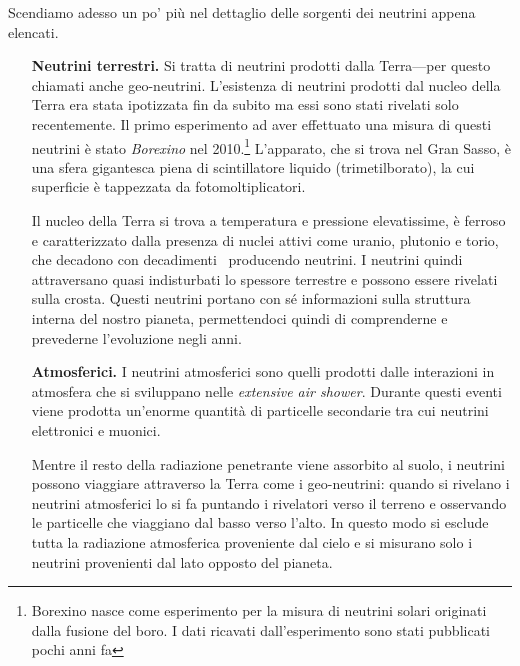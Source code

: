         Scendiamo adesso un po' più nel dettaglio delle sorgenti dei neutrini appena elencati.
        \begin{enumerate}[wide = 0pt, leftmargin = \parindent]
            \item[\textbf{Neutrini terrestri.}] Si tratta di neutrini prodotti dalla Terra---per questo chiamati anche geo-neutrini. L'esistenza di neutrini prodotti dal nucleo della Terra era stata ipotizzata fin da subito ma essi sono stati rivelati solo recentemente. Il primo esperimento ad aver effettuato una misura di questi neutrini è stato \emph{Borexino} nel 2010.\footnote{Borexino nasce come esperimento per la misura di neutrini solari originati dalla fusione del boro. I dati ricavati dall'esperimento sono stati pubblicati pochi anni fa} L'apparato, che si trova nel Gran Sasso, è una sfera gigantesca piena di scintillatore liquido (trimetilborato), la cui superficie è tappezzata da fotomoltiplicatori.
            
            Il nucleo della Terra si trova a temperatura e pressione elevatissime, è ferroso e caratterizzato dalla presenza di nuclei attivi come uranio, plutonio e torio, che decadono con decadimenti \betap\ producendo neutrini. I neutrini quindi attraversano quasi indisturbati lo spessore terrestre e possono essere rivelati sulla crosta. Questi neutrini portano con sé informazioni sulla struttura interna del nostro pianeta, permettendoci quindi di comprenderne e prevederne l'evoluzione negli anni.
            
            
            \item[\textbf{Atmosferici.}] I neutrini atmosferici sono quelli prodotti dalle interazioni in atmosfera che si sviluppano nelle \textit{extensive air shower}. Durante questi eventi viene prodotta un'enorme quantità di particelle secondarie tra cui neutrini elettronici e muonici.
            
            Mentre il resto della radiazione penetrante viene assorbito al suolo, i neutrini possono viaggiare attraverso la Terra come i geo-neutrini: quando si rivelano i neutrini atmosferici lo si fa puntando i rivelatori verso il terreno e osservando le particelle che viaggiano dal basso verso l'alto. In questo modo si esclude tutta la radiazione atmosferica proveniente dal cielo e si misurano solo i neutrini provenienti dal lato opposto del pianeta.


\end{enumerate}
